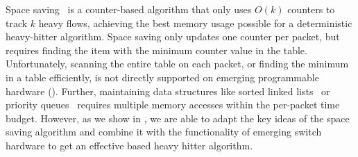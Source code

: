 Space saving~\cite{metwally2005efficient} is a counter-based algorithm
that only uses $O(k)$ counters to track $k$ heavy flows, achieving the best
memory usage possible for a deterministic heavy-hitter algorithm. Space saving
only updates one counter per packet, but requires finding the item with the
minimum counter value in the table. Unfortunately, scanning the entire table on
each packet, or finding the minimum in a table efficiently, is not directly
supported on emerging programmable hardware (). Further,
maintaining data structures like sorted linked
lists~\cite{metwally2005efficient} or priority queues~\cite{pifo} requires
multiple memory accesses within the per-packet time budget. %
%
However, as we show in , we are able to adapt the key ideas of the space saving algorithm and combine it with the functionality of emerging switch hardware to get an effective \TheSystem based heavy hitter algorithm. 
